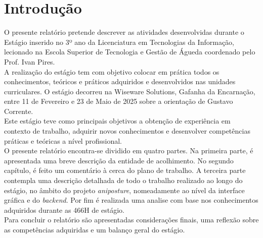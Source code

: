 \chapter{Introdução}%
\label{chapter:introduction}

O presente relatório pretende descrever as atividades desenvolvidas durante o Estágio
inserido no 3º ano da Licenciatura em Tecnologias da Informação, lecionado na 
Escola Superior de Tecnologia e Gestão de Águeda coordenado
pelo Prof. Ivan Pires.
\\

A realização do estágio tem com objetivo colocar em prática todos os conhecimentos,
teóricos e práticos adquiridos e desenvolvidos nas unidades curriculares.
O estágio decorreu na Wiseware Solutions, Gafanha da Encarnação, entre 11
de Fevereiro e 23 de Maio de 2025 sobre a orientação de
Gustavo Corrente.
\\

Este estágio teve como principais objetivos a obtenção de experiência em contexto de trabalho, adquirir novos conhecimentos e desenvolver competências práticas e teóricas a nível profissional. 
\\

O presente relatório encontra-se dividido em quatro partes. Na primeira parte, é apresentada uma breve descrição da entidade de acolhimento. No segundo capítulo, é feito um comentário à cerca do plano de trabalho. A terceira parte contempla uma descrição detalhada de todo o trabalho realizado ao longo do estágio, no âmbito do projeto \textit{aniposture}, nomeadamente ao nível da interface gráfica e do \textit{backend}. Por fim é realizada uma analise com base nos conhecimentos adquiridos durante as 466H de estágio.   
\\

Para concluir o relatório são apresentadas considerações finais, uma reflexão sobre as competências adquiridas e um balanço geral do estágio.

\begin{introduction}
\end{introduction}